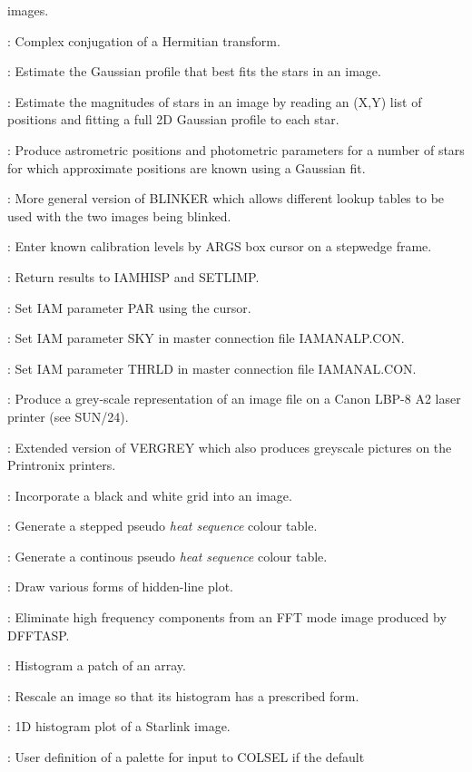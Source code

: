 \begin{description}
images.
\item [FTCONJ]: Complex conjugation of a Hermitian transform.
\item [GAUFIT]: Estimate the Gaussian profile that best fits the stars in an
image.
\item [GAUMAG]: Estimate the magnitudes of stars in an image by reading an
(X,Y) list of positions and fitting a full 2D Gaussian profile to each star.
\item [GAUSFIT]:  Produce astrometric positions and photometric parameters for
a number of stars for which approximate positions are known using a Gaussian
fit.
\item [GBLINKER]: More general version of BLINKER which allows different
lookup tables to be used with the two images being blinked.
\item [GETLEV]: Enter known calibration levels by ARGS box cursor on a
stepwedge frame.
\item [GETLIM*]: Return results to IAMHISP and SETLIMP.
\item [GETPAR]: Set IAM parameter PAR using the cursor.
\item [GETSKY]: Set IAM parameter SKY in master connection file IAMANALP.CON.
\item [GETTHR]: Set IAM parameter THRLD in master connection file IAMANAL.CON.
\item [GREYLASER]: Produce a grey-scale representation of an image file on
a Canon LBP-8 A2 laser printer (see SUN/24).
\item [GREYSCALE]: Extended version of VERGREY which also produces greyscale
pictures on the Printronix printers.
\item [GRID]: Incorporate a black and white grid into an image.
\item [HEATCOL]: Generate a stepped pseudo {\em heat sequence} colour table.
\item [HEATCON]: Generate a continous pseudo {\em heat sequence} colour table.
\item [HIDE]: Draw various forms of hidden-line plot.
\item [HIFREQ*]: Eliminate high frequency components from an FFT mode image
produced by DFFTASP.
\item [HIST*]: Histogram a patch of an array.
\item [HISTMATCH]: Rescale an image so that its histogram has a prescribed form.
\item [HISTPLOT]: 1D histogram plot of a Starlink image.
\item [HSICOL]: User definition of a palette for input to COLSEL if the default

\end{description}

